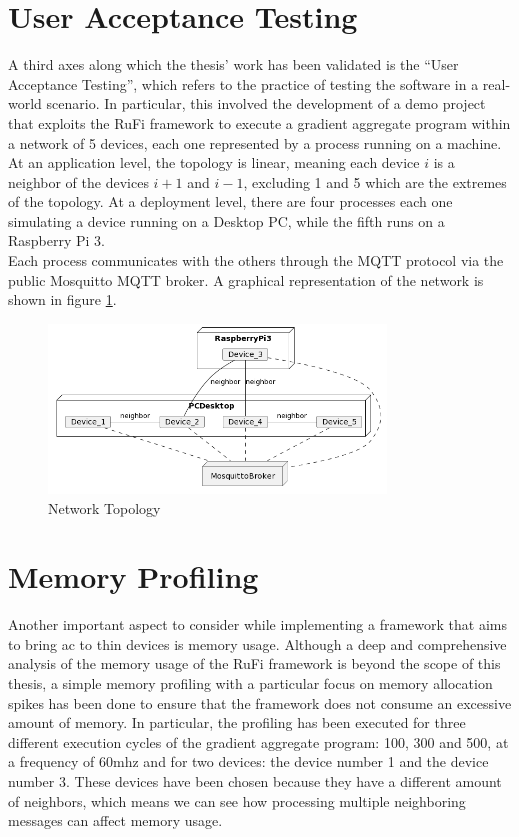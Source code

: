 

\section{User Acceptance Testing}
A third axes along which the thesis' work has been validated is the ``User Acceptance Testing'', which refers to the practice of testing the software in a real-world scenario.
In particular, this involved the development of a demo project that exploits the RuFi framework to execute a gradient aggregate program within a network of 5 devices, each one
represented by a process running on a machine. At an application level, the topology is linear, meaning each device $i$ is a neighbor of the devices $i+1$ and $i-1$, excluding 1 and 5
which are the extremes of the topology. At a deployment level, there are four processes each one simulating a device running on a Desktop PC, while the fifth runs on a Raspberry Pi 3.\\
Each process communicates with the others through the MQTT protocol via the public Mosquitto MQTT broker. A graphical representation of the network is shown in figure \ref{fig:network_topology}.

\begin{figure}[ht!]
    \centering
    \includegraphics[width=0.8\textwidth]{figures/diagrams/img/deployment-demo.png}
    \caption{Network Topology}
    \label{fig:network_topology}
\end{figure}

\section{Memory Profiling}
Another important aspect to consider while implementing a framework that aims to bring \ac{ac} to thin devices is memory usage. Although a deep and comprehensive analysis of
the memory usage of the RuFi framework is beyond the scope of this thesis, a simple memory profiling with a particular focus on memory allocation spikes has been done to ensure that the framework does not consume an excessive amount of memory.
In particular, the profiling has been executed for three different execution cycles of the gradient aggregate program: 100, 300 and 500, at a frequency of 60mhz and for two devices:
the device number 1 and the device number 3. These devices have been chosen because they have a different amount of neighbors, which means we can see how processing multiple neighboring messages
can affect memory usage.

